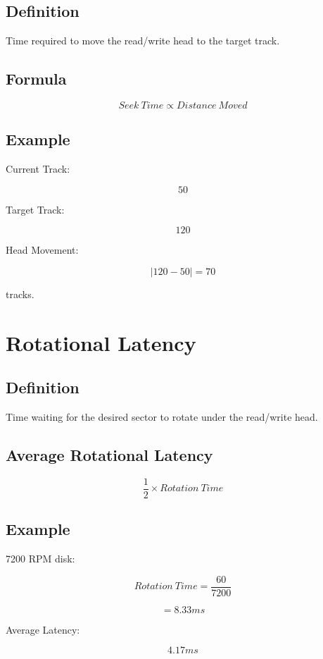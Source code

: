 \subsection{Definition}

Time required to move the read/write head to the target track.

\subsection{Formula}

\[
Seek\ Time \propto Distance\ Moved
\]

\subsection{Example}

Current Track:

\[
50
\]

Target Track:

\[
120
\]

Head Movement:

\[
|120-50|=70
\]

tracks.

\section{Rotational Latency}

\subsection{Definition}

Time waiting for the desired sector to rotate under the read/write head.

\subsection{Average Rotational Latency}

\[
\frac{1}{2}\times Rotation\ Time
\]

\subsection{Example}

7200 RPM disk:

\[
Rotation\ Time=\frac{60}{7200}
\]

\[
=8.33ms
\]

Average Latency:

\[
4.17ms
\]

